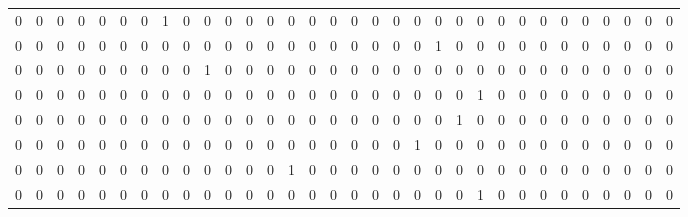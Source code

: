 \begin{tabular}{rrrrrrrrrrrrrrrrrrrrrrrrrrrrrrrr}
       0 &       0 &       0 &       0 &       0 &       0 &       0 &       1 &       0 &       0 &       0 &       0 &       0 &       0 &       0 &       0 &       0 &       0 &       0 &       0 &       0 &       0 &       0 &       0 &       0 &       0 &       0 &       0 &       0 &       0 &       0 &       0 \\
       0 &       0 &       0 &       0 &       0 &       0 &       0 &       0 &       0 &       0 &       0 &       0 &       0 &       0 &       0 &       0 &       0 &       0 &       0 &       0 &       1 &       0 &       0 &       0 &       0 &       0 &       0 &       0 &       0 &       0 &       0 &       0 \\
       0 &       0 &       0 &       0 &       0 &       0 &       0 &       0 &       0 &       1 &       0 &       0 &       0 &       0 &       0 &       0 &       0 &       0 &       0 &       0 &       0 &       0 &       0 &       0 &       0 &       0 &       0 &       0 &       0 &       0 &       0 &       0 \\
       0 &       0 &       0 &       0 &       0 &       0 &       0 &       0 &       0 &       0 &       0 &       0 &       0 &       0 &       0 &       0 &       0 &       0 &       0 &       0 &       0 &       0 &       1 &       0 &       0 &       0 &       0 &       0 &       0 &       0 &       0 &       0 \\
       0 &       0 &       0 &       0 &       0 &       0 &       0 &       0 &       0 &       0 &       0 &       0 &       0 &       0 &       0 &       0 &       0 &       0 &       0 &       0 &       0 &       1 &       0 &       0 &       0 &       0 &       0 &       0 &       0 &       0 &       0 &       0 \\
       0 &       0 &       0 &       0 &       0 &       0 &       0 &       0 &       0 &       0 &       0 &       0 &       0 &       0 &       0 &       0 &       0 &       0 &       0 &       1 &       0 &       0 &       0 &       0 &       0 &       0 &       0 &       0 &       0 &       0 &       0 &       0 \\
       0 &       0 &       0 &       0 &       0 &       0 &       0 &       0 &       0 &       0 &       0 &       0 &       0 &       1 &       0 &       0 &       0 &       0 &       0 &       0 &       0 &       0 &       0 &       0 &       0 &       0 &       0 &       0 &       0 &       0 &       0 &       0 \\
       0 &       0 &       0 &       0 &       0 &       0 &       0 &       0 &       0 &       0 &       0 &       0 &       0 &       0 &       0 &       0 &       0 &       0 &       0 &       0 &       0 &       0 &       1 &       0 &       0 &       0 &       0 &       0 &       0 &       0 &       0 &       0 \\

\end{tabular}
